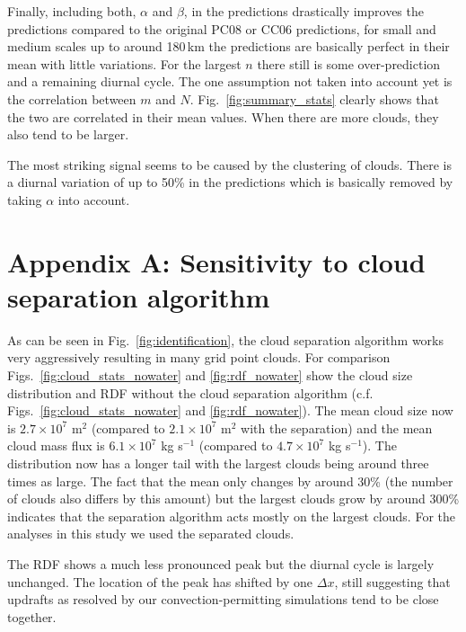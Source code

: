 \documentclass[a4paper, 12pt]{article}
\begin{document}
Finally, including both, $\alpha$ and $\beta$, in the predictions drastically improves the predictions compared to the original PC08 or CC06 predictions, for small and medium scales up to around 180\,km the predictions are basically perfect in their mean with little variations. For the largest $n$ there still is some over-prediction and a remaining diurnal cycle. The one assumption not taken into account yet is the correlation between $m$ and $N$. Fig.~\ref{fig:summary_stats} clearly shows that the two are correlated in their mean values. When there are more clouds, they also tend to be larger. 

The most striking signal seems to be caused by the clustering of clouds. There is a diurnal variation of up to 50\% in the predictions which is basically removed by taking $\alpha$ into account. 

\section{Appendix A: Sensitivity to cloud separation algorithm}
As can be seen in Fig.~\ref{fig:identification}, the cloud separation algorithm works very aggressively resulting in many grid point clouds. For comparison Figs.~\ref{fig:cloud_stats_nowater} and \ref{fig:rdf_nowater} show the cloud size distribution and RDF without the cloud separation algorithm (c.f. Figs.~\ref{fig:cloud_stats_nowater} and \ref{fig:rdf_nowater}). The mean cloud size now is $2.7\times 10^7$ m$^2$ (compared to $2.1\times 10^7$ m$^2$ with the separation) and the mean cloud mass flux is $6.1\times 10^7$ kg s$^{-1}$ (compared to $4.7\times 10^7$ kg s$^{-1}$). The distribution now has a longer tail with the largest clouds being around three times as large. The fact that the mean only changes by around 30\% (the number of clouds also differs by this amount) but the largest clouds grow by around 300\% indicates that the separation algorithm acts mostly on the largest clouds. For the analyses in this study we used the separated clouds. 

The RDF shows a much less pronounced peak but the diurnal cycle is largely unchanged. The location of the peak has shifted by one $\Delta x$, still suggesting that updrafts as resolved by our convection-permitting simulations tend to be close together.  
\end{document}
